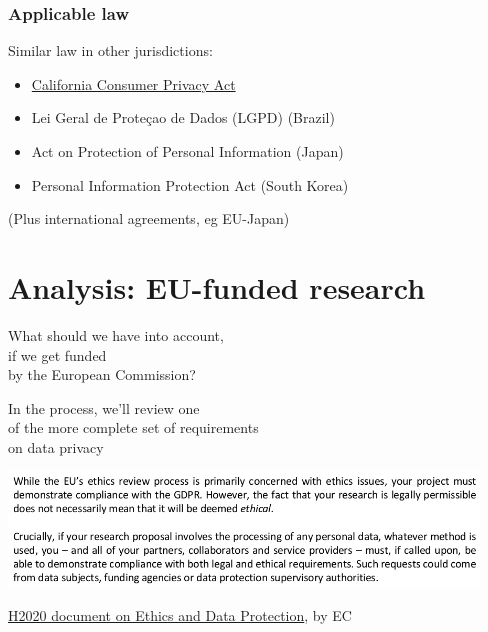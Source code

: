 \documentclass[17pt,aspectratio=169,hyperref={pdfusetitle,colorlinks,allcolors=olive}]{beamer}
\begin{document}
\begin{frame}[fragile]
  \frametitle{Applicable law}

  Similar law in other jurisdictions:

  {\small
  \begin{itemize}
  \item \href{https://www.oag.ca.gov/privacy/ccpa}{California Consumer Privacy Act}
  \item Lei Geral de Proteçao de Dados (LGPD) (Brazil)
  \item Act on Protection of Personal Information (Japan)
  \item Personal Information Protection Act (South Korea)
  \end{itemize}
  }
  (Plus international agreements, eg EU-Japan)
\end{frame}

\section{Analysis: EU-funded research}

\begin{frame}[fragile]

  {\large What should we have into account, \\
    if we get funded \\
    by the European Commission? \\
  }
  
  \begin{flushright}
    In the process, we'll review one \\
    of the more complete set of requirements \\
    on data privacy \\
  \end{flushright}
\end{frame}

\begin{frame}[fragile]

  \begin{center}
    \includegraphics[width=12.5cm]{figs/legal-ethical}
  \end{center}
  {\footnotesize
    \begin{flushright}
    \href{https://ec.europa.eu/research/participants/data/ref/h2020/grants_manual/hi/ethics/h2020_hi_ethics-data-protection_en.pdf}{H2020 document on Ethics and Data Protection},  by EC
    \end{flushright}
  }
\end{frame}
\end{document}
